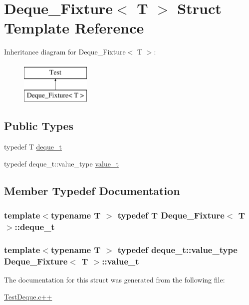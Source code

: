 \hypertarget{structDeque__Fixture}{\section{Deque\-\_\-\-Fixture$<$ T $>$ Struct Template Reference}
\label{structDeque__Fixture}
}
Inheritance diagram for Deque\-\_\-\-Fixture$<$ T $>$\-:\begin{figure}[H]
\begin{center}
\leavevmode
\includegraphics[height=2.000000cm]{structDeque__Fixture}
\end{center}
\end{figure}
\subsection*{Public Types}
\begin{DoxyCompactItemize}
\item 
typedef T \hyperlink{structDeque__Fixture_abca7ea1144ae2545c5d1d516696d6cd1}{deque\-\_\-t}
\item 
typedef deque\-\_\-t\-::value\-\_\-type \hyperlink{structDeque__Fixture_a6f961ca3cd056defc89d8e523807c88e}{value\-\_\-t}
\end{DoxyCompactItemize}


\subsection{Member Typedef Documentation}
\hypertarget{structDeque__Fixture_abca7ea1144ae2545c5d1d516696d6cd1}{
\subsubsection[{deque\-\_\-t}]{\setlength{\rightskip}{0pt plus 5cm}template$<$typename T $>$ typedef T {\bf Deque\-\_\-\-Fixture}$<$ T $>$\-::{\bf deque\-\_\-t}}}\label{structDeque__Fixture_abca7ea1144ae2545c5d1d516696d6cd1}
\hypertarget{structDeque__Fixture_a6f961ca3cd056defc89d8e523807c88e}{
\subsubsection[{value\-\_\-t}]{\setlength{\rightskip}{0pt plus 5cm}template$<$typename T $>$ typedef deque\-\_\-t\-::value\-\_\-type {\bf Deque\-\_\-\-Fixture}$<$ T $>$\-::{\bf value\-\_\-t}}}\label{structDeque__Fixture_a6f961ca3cd056defc89d8e523807c88e}


The documentation for this struct was generated from the following file\-:\begin{DoxyCompactItemize}
\item 
\hyperlink{TestDeque_8c_09_09}{Test\-Deque.\-c++}\end{DoxyCompactItemize}
